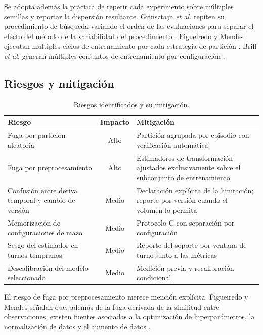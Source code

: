 Se adopta además la práctica de repetir cada experimento sobre múltiples
semillas y reportar la dispersión resultante. Grinsztajn \textit{et al.}
repiten su procedimiento de búsqueda variando el orden de las evaluaciones
para separar el efecto del método de la variabilidad del procedimiento
\cite{grinsztajn_trees_2022}. Figueiredo y Mendes ejecutan múltiples ciclos
de entrenamiento por cada estrategia de partición
\cite{figueiredo_leakage_2024}. Brill \textit{et al.} generan múltiples
conjuntos de entrenamiento por configuración \cite{brill_winprob_2026}.


\subsection{Riesgos y mitigación}
\label{subsec:riesgos}

\begin{table}[!t]
\centering
\caption{Riesgos identificados y su mitigación.}
\label{tab:riesgos}
\footnotesize
\begin{tabularx}{\columnwidth}{@{}P{2.0cm} c Y@{}}
\toprule
\textbf{Riesgo} & \textbf{Impacto} & \textbf{Mitigación}\\
\midrule
Fuga por partición aleatoria & Alto &
Partición agrupada por episodio con verificación automática\\[2pt]
Fuga por preprocesamiento & Alto &
Estimadores de transformación ajustados exclusivamente sobre el
subconjunto de entrenamiento\\[2pt]
Confusión entre deriva temporal y cambio de versión & Medio &
Declaración explícita de la limitación; reporte por versión cuando el
volumen lo permita\\[2pt]
Memorización de configuraciones de mazo & Medio &
Protocolo C con separación por configuración\\[2pt]
Sesgo del estimador en turnos tempranos & Medio &
Reporte del soporte por ventana de turno junto a las métricas\\[2pt]
Descalibración del modelo seleccionado & Medio &
Medición previa y recalibración condicional\\
\bottomrule
\end{tabularx}
\end{table}

El riesgo de fuga por preprocesamiento merece mención explícita. Figueiredo
y Mendes señalan que, además de la fuga derivada de la similitud entre
observaciones, existen fuentes asociadas a la optimización de
hiperparámetros, la normalización de datos y el aumento de datos
\cite{figueiredo_leakage_2024}.

